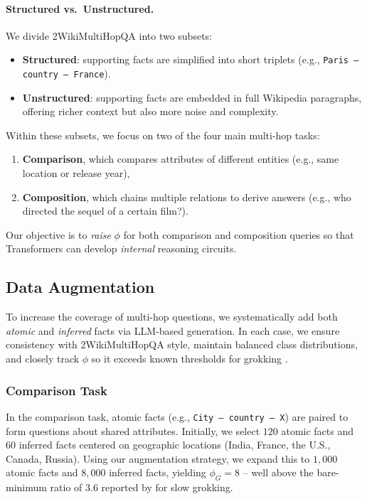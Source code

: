         \paragraph{Structured vs.\ Unstructured.}
            We divide 2WikiMultiHopQA into two subsets:
            \begin{itemize}
                \item \textbf{Structured}: supporting facts are simplified into short triplets (e.g., \texttt{Paris -- country -- France}).
                \item \textbf{Unstructured}: supporting facts are embedded in full Wikipedia paragraphs, offering richer context but also more noise and complexity.
            \end{itemize}
            Within these subsets, we focus on two of the four main multi-hop tasks: 
            \begin{enumerate}
                \item \textbf{Comparison}, which compares attributes of different entities (e.g., same location or release year),
                \item \textbf{Composition}, which chains multiple relations to derive answers (e.g., who directed the sequel of a certain film?).
            \end{enumerate}
            Our objective is to \textit{raise} $\phi$ for both comparison and composition queries so that Transformers can develop \emph{internal} reasoning circuits.
    
    \subsection{Data Augmentation}\label{sec:method_datasynthesis}
    
        To increase the coverage of multi-hop questions, we systematically add both \emph{atomic} and \emph{inferred} facts via LLM-based generation. 
        In each case, we ensure consistency with 2WikiMultiHopQA style, maintain balanced class distributions, and closely track $\phi$ so it exceeds known thresholds for grokking \citep{wang_grokked_2024}.
        
        \subsubsection{Comparison Task}
            \label{sec:method_comparison}
            
            In the comparison task, atomic facts (e.g., \texttt{City -- country -- X}) are paired to form questions about shared attributes. 
            Initially, we select $120$ atomic facts and $60$ inferred facts centered on geographic locations (India, France, the U.S., Canada, Russia). 
            Using our augmentation strategy, we expand this to $1{,}000$ atomic facts and $8{,}000$ inferred facts, yielding $\phi_G=8$ -- well above the bare-minimum ratio of $3.6$ reported by \citet{wang_grokked_2024} for slow grokking.
            
